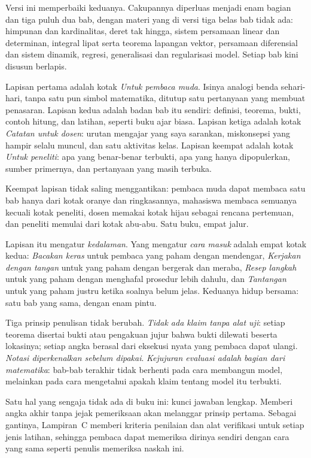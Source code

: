 \documentclass[11pt,a4paper,oneside]{book}
\theoremstyle{definition}
\theoremstyle{plain}
\theoremstyle{remark}
\begin{document}
Versi ini memperbaiki keduanya. Cakupannya diperluas menjadi enam bagian dan tiga puluh
dua bab, dengan materi yang di versi tiga belas bab tidak ada: himpunan dan
kardinalitas, deret tak hingga, sistem persamaan linear dan determinan, integral lipat
serta teorema lapangan vektor, persamaan diferensial dan sistem dinamik, regresi,
generalisasi dan regularisasi model. Setiap bab kini disusun berlapis.

Lapisan pertama adalah kotak \emph{Untuk pembaca muda}. Isinya analogi benda
sehari-hari, tanpa satu pun simbol matematika, ditutup satu pertanyaan yang membuat
penasaran. Lapisan kedua adalah badan bab itu sendiri: definisi, teorema, bukti,
contoh hitung, dan latihan, seperti buku ajar biasa. Lapisan ketiga adalah kotak
\emph{Catatan untuk dosen}: urutan mengajar yang saya sarankan, miskonsepsi yang
hampir selalu muncul, dan satu aktivitas kelas. Lapisan keempat adalah kotak
\emph{Untuk peneliti}: apa yang benar-benar terbukti, apa yang hanya dipopulerkan,
sumber primernya, dan pertanyaan yang masih terbuka.

Keempat lapisan tidak saling menggantikan: pembaca muda dapat membaca satu bab hanya
dari kotak oranye dan ringkasannya, mahasiswa membaca semuanya kecuali kotak peneliti,
dosen memakai kotak hijau sebagai rencana pertemuan, dan peneliti memulai dari kotak
abu-abu. Satu buku, empat jalur.

Lapisan itu mengatur \emph{kedalaman}. Yang mengatur \emph{cara masuk} adalah empat
kotak kedua: \emph{Bacakan keras} untuk pembaca yang paham dengan mendengar,
\emph{Kerjakan dengan tangan} untuk yang paham dengan bergerak dan meraba,
\emph{Resep langkah} untuk yang paham dengan menghafal prosedur lebih dahulu, dan
\emph{Tantangan} untuk yang paham justru ketika soalnya belum jelas. Keduanya hidup
bersama: satu bab yang sama, dengan enam pintu.

Tiga prinsip penulisan tidak berubah. \emph{Tidak ada klaim tanpa alat uji}: setiap
teorema disertai bukti atau pengakuan jujur bahwa bukti dilewati beserta lokasinya;
setiap angka berasal dari eksekusi nyata yang pembaca dapat ulangi. \emph{Notasi
diperkenalkan sebelum dipakai}. \emph{Kejujuran evaluasi adalah bagian dari
matematika}: bab-bab terakhir tidak berhenti pada cara membangun model, melainkan
pada cara mengetahui apakah klaim tentang model itu terbukti.

Satu hal yang sengaja tidak ada di buku ini: kunci jawaban lengkap. Memberi angka
akhir tanpa jejak pemeriksaan akan melanggar prinsip pertama. Sebagai gantinya,
Lampiran~C memberi kriteria penilaian dan alat verifikasi untuk setiap jenis latihan,
sehingga pembaca dapat memeriksa dirinya sendiri dengan cara yang sama seperti
penulis memeriksa naskah ini.
\end{document}
